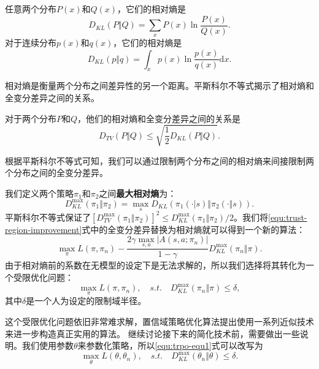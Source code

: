 \begin{definition}
    任意两个分布$P(x)$和$Q(x)$，它们的相对熵是
    \begin{equation}
        D_{KL}(P \Vert Q) = \sum_{x} P(x) \ln \frac{P(x)}{Q(x)}.
    \end{equation}
    对于连续分布$p(x)$和$q(x)$，它们的相对熵是
    \begin{equation}
        D_{KL}(p \Vert q) = \int_{x} p(x) \ln \frac{p(x)}{q(x)} \mathrm{d}x.
    \end{equation}
\end{definition}
相对熵是衡量两个分布之间差异性的另一个距离。平斯科尔不等式揭示了相对熵和全变分差异之间的关系。
\begin{theorem}
    对于两个分布$P$和$Q$，他们的相对熵和全变分差异之间的关系是
    \begin{equation}
        D_{TV}(P \Vert Q) \le \sqrt{\frac{1}{2} D_{KL}(P \Vert Q)}.
    \end{equation}
\end{theorem}
根据平斯科尔不等式可知，我们可以通过限制两个分布之间的相对熵来间接限制两个分布之间的全变分差异。

我们定义两个策略$\pi_1$和$\pi_2$之间\textbf{最大相对熵}为：
\begin{equation}
    D^{\max}_{KL}(\pi_1 \Vert \pi_2) = \max_s D_{KL}(\pi_1(\cdot \vert s) \Vert \pi_2(\cdot \Vert s)).
\end{equation}
平斯科尔不等式保证了$[D^{\max}_{TV}(\pi_1 \Vert \pi_2)]^2 \le D^{\max}_{KL}(\pi_1 \Vert \pi_2)/2$。我们将\eqref{equ:trust-region-improvement}式中的全变分差异替换为相对熵就可以得到一个新的算法：
\begin{equation}
    \max_{\pi} L(\pi, \pi_n) - \frac{2 \gamma \max_{s, a} \vert A(s,a; \pi_n) \vert}{1 - \gamma} D^{\max}_{KL} (\pi_n \Vert \pi).
\end{equation}
由于相对熵前的系数在无模型的设定下是无法求解的，所以我们选择将其转化为一个受限优化问题：
\begin{equation}\label{equ:trpo-equ1}
    \max_{\pi} L(\pi, \pi_n), \quad s.t.\quad D^{\max}_{KL}(\pi_n \Vert \pi) \le \delta,
\end{equation}
其中$\delta$是一个人为设定的限制域半径。

这个受限优化问题依旧非常难求解，置信域策略优化算法提出使用一系列近似技术来进一步构造真正实用的算法。 继续讨论接下来的简化技术前，需要做出一些说明。我们使用参数$\theta$来参数化策略，所以\eqref{equ:trpo-equ1}式可以改写为
\begin{equation}
    \max_{\theta} L(\theta, \theta_n), \quad s.t.\quad D^{\max}_{KL}(\theta_n \Vert \theta) \le \delta.
\end{equation}

